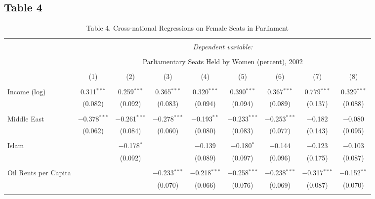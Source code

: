 \documentclass[12pt,letterpaper]{article}
\begin{document}
\subsection*{Table 4}



\begin{table}[!htbp] \centering 
	\caption*{Table 4. Cross-national Regressions on Female Seats in Parliament} 
	\label{} 
	\small 
	\begin{tabular}{@{\extracolsep{-15pt}}lcccccccc} 
		\\[-1.8ex]\hline 
		\hline \\[-1.8ex] 
		& \multicolumn{8}{c}{\textit{Dependent variable:}} \\ 
		\cline{2-9} 
		\\[-1.8ex] & \multicolumn{8}{c}{Parliamentary Seats Held by Women (percent), 2002} \\ 
		\\[-1.8ex] & (1) & (2) & (3) & (4) & (5) & (6) & (7) & (8)\\ 
		\hline \\[-1.8ex] 
		Income (log) & 0.311$^{***}$ & 0.259$^{***}$ & 0.365$^{***}$ & 0.320$^{***}$ & 0.390$^{***}$ & 0.367$^{***}$ & 0.779$^{***}$ & 0.329$^{***}$ \\ 
		& (0.082) & (0.092) & (0.083) & (0.094) & (0.094) & (0.089) & (0.137) & (0.088) \\ 
		& & & & & & & & \\ 
		Middle East & $-$0.378$^{***}$ & $-$0.261$^{***}$ & $-$0.278$^{***}$ & $-$0.193$^{**}$ & $-$0.233$^{***}$ & $-$0.253$^{***}$ & $-$0.182 & $-$0.080 \\ 
		& (0.062) & (0.084) & (0.060) & (0.080) & (0.083) & (0.077) & (0.143) & (0.095) \\ 
		& & & & & & & & \\ 
		Islam &  & $-$0.178$^{*}$ &  & $-$0.139 & $-$0.180$^{*}$ & $-$0.144 & $-$0.123 & $-$0.103 \\ 
		&  & (0.092) &  & (0.089) & (0.097) & (0.096) & (0.175) & (0.087) \\ 
		& & & & & & & & \\ 
		Oil Rents per Capita &  &  & $-$0.233$^{***}$ & $-$0.218$^{***}$ & $-$0.258$^{***}$ & $-$0.238$^{***}$ & $-$0.317$^{***}$ & $-$0.152$^{**}$ \\ 
		&  &  & (0.070) & (0.066) & (0.076) & (0.069) & (0.087) & (0.070) \\ 
		& & & & & & & & \\ 

\end{tabular}
\end{table}
\end{document}
